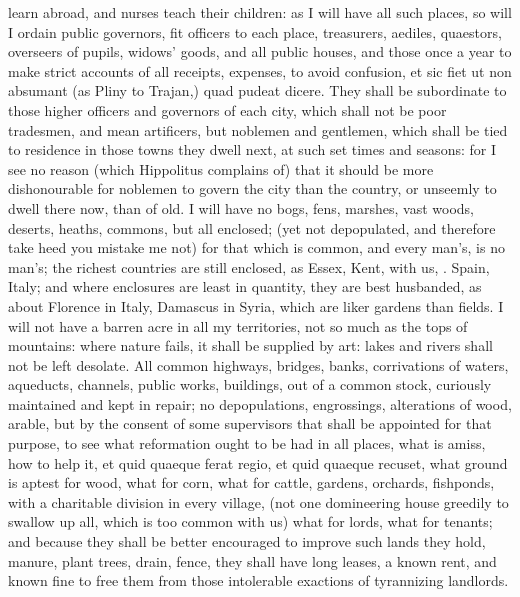 {learn abroad, and nurses teach their children: as I will have all such
places, so will I ordain public governors, fit officers to each
place, treasurers, aediles, quaestors, overseers of pupils, widows'
goods, and all public houses, \etc{} and those once a year to make strict
accounts of all receipts, expenses, to avoid confusion, et sic fiet ut
non absumant (as Pliny to Trajan,) quad pudeat dicere. They shall be
subordinate to those higher officers and governors of each city, which
shall not be poor tradesmen, and mean artificers, but noblemen and
gentlemen, which shall be tied to residence in those towns they dwell
next, at such set times and seasons: for I see no reason (which
Hippolitus complains of) that it should be more dishonourable for
noblemen to govern the city than the country, or unseemly to dwell
there now, than of old. I will have no bogs, fens, marshes, vast
woods, deserts, heaths, commons, but all enclosed; (yet not
depopulated, and therefore take heed you mistake me not) for that which
is common, and every man's, is no man's; the richest countries are
still enclosed, as Essex, Kent, with us, \etc{}. Spain, Italy; and where
enclosures are least in quantity, they are best husbanded, as
about Florence in Italy, Damascus in Syria, \etc{} which are liker gardens
than fields. I will not have a barren acre in all my territories, not
so much as the tops of mountains: where nature fails, it shall be
supplied by art: lakes and rivers shall not be left desolate. All
common highways, bridges, banks, corrivations of waters, aqueducts,
channels, public works, buildings, \etc{} out of a common stock,
curiously maintained and kept in repair; no depopulations, engrossings,
alterations of wood, arable, but by the consent of some supervisors
that shall be appointed for that purpose, to see what reformation ought
to be had in all places, what is amiss, how to help it, et quid quaeque
ferat regio, et quid quaeque recuset, what ground is aptest for wood,
what for corn, what for cattle, gardens, orchards, fishponds, \etc{} with
a charitable division in every village, (not one domineering house
greedily to swallow up all, which is too common with us) what for
lords, what for tenants; and because they shall be better
encouraged to improve such lands they hold, manure, plant trees, drain,
fence, \etc{} they shall have long leases, a known rent, and known fine to
free them from those intolerable exactions of tyrannizing landlords.

}
